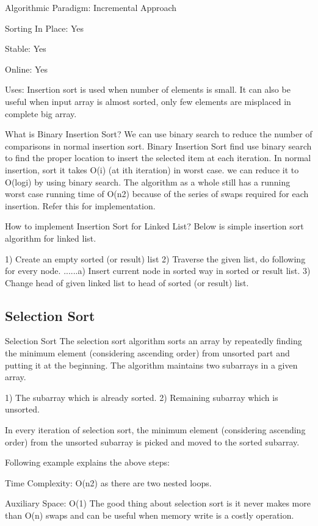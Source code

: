 \documentclass{article}
\begin{document}
Algorithmic Paradigm: Incremental Approach

Sorting In Place: Yes

Stable: Yes

Online: Yes

Uses: Insertion sort is used when number of elements is small. It can also be useful when input array is almost sorted, only few elements are misplaced in complete big array.

What is Binary Insertion Sort?
We can use binary search to reduce the number of comparisons in normal insertion sort. Binary Insertion Sort find use binary search to find the proper location to insert the selected item at each iteration. In normal insertion, sort it takes O(i) (at ith iteration) in worst case. we can reduce it to O(logi) by using binary search. The algorithm as a whole still has a running worst case running time of O(n2) because of the series of swaps required for each insertion. Refer this for implementation.

How to implement Insertion Sort for Linked List?
Below is simple insertion sort algorithm for linked list.

1) Create an empty sorted (or result) list
2) Traverse the given list, do following for every node.
......a) Insert current node in sorted way in sorted or result list.
3) Change head of given linked list to head of sorted (or result) list. 


\subsection{Selection Sort}

Selection Sort
The selection sort algorithm sorts an array by repeatedly finding the minimum element (considering ascending order) from unsorted part and putting it at the beginning. The algorithm maintains two subarrays in a given array.

1) The subarray which is already sorted.
2) Remaining subarray which is unsorted.

In every iteration of selection sort, the minimum element (considering ascending order) from the unsorted subarray is picked and moved to the sorted subarray.

Following example explains the above steps:


Time Complexity: O(n2) as there are two nested loops.

Auxiliary Space: O(1)
The good thing about selection sort is it never makes more than O(n) swaps and can be useful when memory write is a costly operation.
\end{document}
